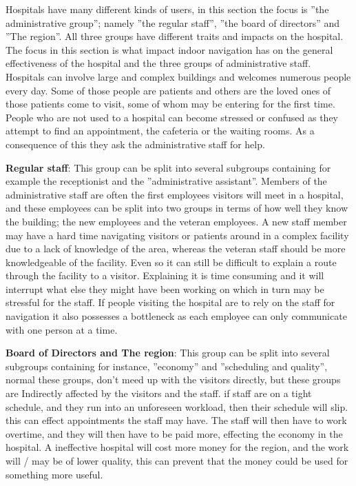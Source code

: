 Hospitals have many different kinds of users, in this section the focus is ''the administrative group''; namely ''the regular staff'', ''the board of directors'' and ''The region''. All three groups have different traits and impacts on the hospital. \\ The focus in this section is what impact indoor navigation has on the general effectiveness of the hospital and the three groups of administrative staff.\\
Hospitals can involve large and complex buildings and welcomes numerous people every day. Some of those people are patients and others are the loved ones of those patients come to visit, some of whom may be entering for the first time. People who are not used to a hospital can become stressed or confused as they attempt to find an appointment, the cafeteria or the waiting rooms. As a consequence of this they ask the administrative staff for help.

\textbf{Regular staff}: This group can be split into several subgroups containing for example the receptionist and the ''administrative assistant''. Members of the administrative staff are often the first employees visitors will meet in a hospital, and these employees can be split into two groups in terms of how well they know the building; the new employees and the veteran employees. A new staff member may have a hard time navigating visitors or patients around in a complex facility due to a lack of knowledge of the area, whereas the veteran staff should be more knowledgeable of the facility. Even so it can still be difficult to explain a route through the facility to a visitor. Explaining it is time consuming and it will interrupt what else they might have been working on which in turn may be stressful for the staff. If people visiting the hospital are to rely on the staff for navigation it also possesses a bottleneck as each employee can only communicate with one person at a time.

\textbf{Board of Directors and The region}: This group can be split into several subgroups containing for instance, ''economy'' and ''scheduling and quality'', normal these groups, don't meed up with the visitors directly, but these groups are Indirectly affected by the visitors and the staff. if staff are on a tight schedule, and they run into an unforeseen workload, then their schedule will slip. this can effect appointments the staff may have. The staff will then have to work overtime, and they will then have to be paid more, effecting the economy in the hospital. A ineffective hospital will cost more money for the region, and the work will / may be of lower quality, this can prevent that the money could be used for something more useful.

